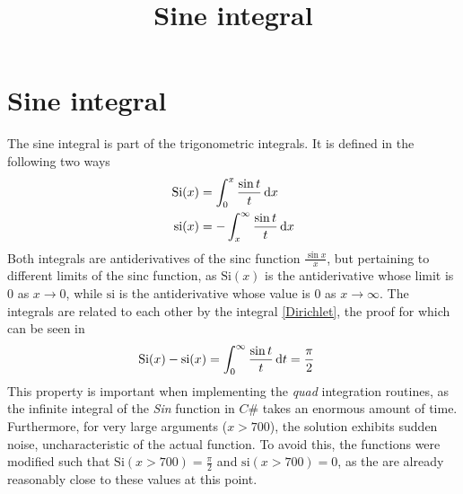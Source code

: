 \documentclass{memoir}
\title{Sine integral}
\date{}
\begin{document}
\section*{Sine integral}
\begin{wrapfigure}{r}{0.5\textwidth}
	
\end{wrapfigure}
The sine integral is part of the trigonometric integrals. It is defined in the following two ways 
\begin{align*}
	\mathrm{Si}(x)&=\int_{0}^{x}\frac{\sin t}{t}\dif x\\
	\mathrm{si}(x)&=-\int_{x}^{\infty}\frac{\sin t}{t}\dif x
\end{align*}
Both integrals are antiderivatives of the sinc function $\frac{\sin x}{x}$, but pertaining to different limits of the sinc function, as $\mathrm{Si}(x)$ is the antiderivative whose limit is $0$ as $x\rightarrow 0$, while $\mathrm{si}$ is the antiderivative whose value is $0$ as $x\rightarrow\infty$.
The integrals are related to each other by the integral \ref{Dirichlet}, the proof for which can be seen in 
\begin{align}
	\label{Dirichlet}
	\mathrm{Si}(x)-\mathrm{si}(x)&=\int_{0}^{\infty}\frac{\sin t}{t}\dif t=\frac{\pi}{2}
\end{align}
This property is important when implementing the \textit{quad} integration routines, as the infinite integral of the \textit{Sin} function in $C\#$ takes an enormous amount of time.\\
Furthermore, for very large arguments ($x>700$), the solution exhibits sudden noise, uncharacteristic of the actual function. To avoid this, the functions were modified such that $\mathrm{Si}(x>700)=\frac{\pi}{2}$ and $\mathrm{si}(x>700)=0$, as the are already reasonably close to these values at this point.




\appendix
\end{document}
